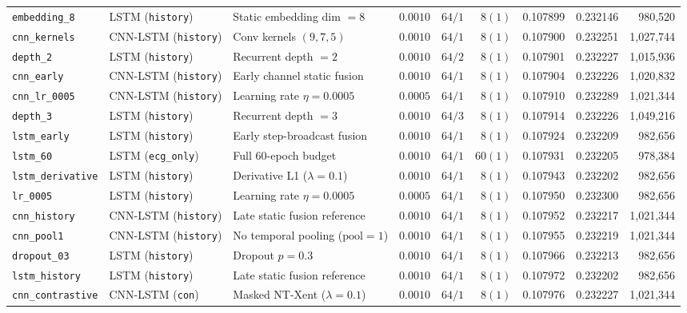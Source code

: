 \documentclass[11pt,a4paper]{article}
\begin{document}
\begin{table}[H]
{\begin{tabular}{lllrrrrrr}
\texttt{embedding\_8} & LSTM (\texttt{history}) & Static embedding dim $= 8$ & $0.0010$ & $64 / 1$ & $8 (1)$ & 0.107899 & 0.232146 & 980,520 \\
\texttt{cnn\_kernels} & CNN-LSTM (\texttt{history}) & Conv kernels $(9, 7, 5)$ & $0.0010$ & $64 / 1$ & $8 (1)$ & 0.107900 & 0.232251 & 1,027,744 \\
\texttt{depth\_2} & LSTM (\texttt{history}) & Recurrent depth $= 2$ & $0.0010$ & $64 / 2$ & $8 (1)$ & 0.107901 & 0.232227 & 1,015,936 \\
\texttt{cnn\_early} & CNN-LSTM (\texttt{history}) & Early channel static fusion & $0.0010$ & $64 / 1$ & $8 (1)$ & 0.107904 & 0.232226 & 1,020,832 \\
\texttt{cnn\_lr\_0005} & CNN-LSTM (\texttt{history}) & Learning rate $\eta = 0.0005$ & $0.0005$ & $64 / 1$ & $8 (1)$ & 0.107910 & 0.232289 & 1,021,344 \\
\texttt{depth\_3} & LSTM (\texttt{history}) & Recurrent depth $= 3$ & $0.0010$ & $64 / 3$ & $8 (1)$ & 0.107914 & 0.232226 & 1,049,216 \\
\texttt{lstm\_early} & LSTM (\texttt{history}) & Early step-broadcast fusion & $0.0010$ & $64 / 1$ & $8 (1)$ & 0.107924 & 0.232209 & 982,656 \\
\texttt{lstm\_60} & LSTM (\texttt{ecg\_only}) & Full 60-epoch budget & $0.0010$ & $64 / 1$ & $60 (1)$ & 0.107931 & 0.232205 & 978,384 \\
\texttt{lstm\_derivative} & LSTM (\texttt{history}) & Derivative L1 ($\lambda = 0.1$) & $0.0010$ & $64 / 1$ & $8 (1)$ & 0.107943 & 0.232202 & 982,656 \\
\texttt{lr\_0005} & LSTM (\texttt{history}) & Learning rate $\eta = 0.0005$ & $0.0005$ & $64 / 1$ & $8 (1)$ & 0.107950 & 0.232300 & 982,656 \\
\texttt{cnn\_history} & CNN-LSTM (\texttt{history}) & Late static fusion reference & $0.0010$ & $64 / 1$ & $8 (1)$ & 0.107952 & 0.232217 & 1,021,344 \\
\texttt{cnn\_pool1} & CNN-LSTM (\texttt{history}) & No temporal pooling ($\text{pool}=1$) & $0.0010$ & $64 / 1$ & $8 (1)$ & 0.107955 & 0.232219 & 1,021,344 \\
\texttt{dropout\_03} & LSTM (\texttt{history}) & Dropout $p = 0.3$ & $0.0010$ & $64 / 1$ & $8 (1)$ & 0.107966 & 0.232213 & 982,656 \\
\texttt{lstm\_history} & LSTM (\texttt{history}) & Late static fusion reference & $0.0010$ & $64 / 1$ & $8 (1)$ & 0.107972 & 0.232202 & 982,656 \\
\texttt{cnn\_contrastive} & CNN-LSTM (\texttt{con}) & Masked NT-Xent ($\lambda=0.1$) & $0.0010$ & $64 / 1$ & $8 (1)$ & 0.107976 & 0.232227 & 1,021,344 \\

\end{tabular}}
\end{table}
\end{document}
